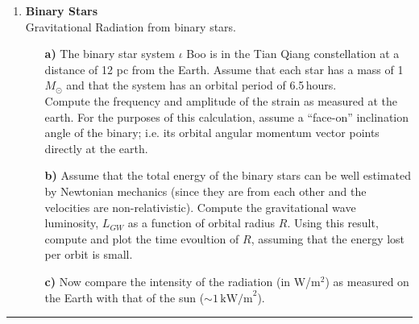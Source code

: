 \documentclass[12pt,twoside]{article}
\begin{document}
\begin{enumerate}
\clearpage
\item
{\bf Binary Stars} \\
Gravitational Radiation from binary stars.
\begin{itemize}

\item[\bf a)] The binary star system $\iota$ Boo is in the Tian Qiang
  constellation at a distance of 12 pc from the Earth. Assume that each star has a mass of 1 $M_{\odot}$ and that the system has an orbital period of 6.5\,hours. \\
  Compute the frequency and amplitude of the strain as measured
  at the earth. For the purposes of this calculation, assume a
  ``face-on'' inclination angle of the binary; i.e. its orbital
  angular momentum vector points directly at the earth.

\item[\bf b)] Assume that the total energy of the binary stars can
  be well estimated by Newtonian mechanics (since they are from each
  other and the velocities are non-relativistic). Compute the
  gravitational wave luminosity, $L_{GW}$ as a function of orbital
  radius $R$. Using this result, compute and plot the time evoultion
  of $R$, assuming that the energy lost per orbit is small.

\item[\bf c)] Now compare the intensity of the radiation (in W/m$^2$)
as measured on the Earth with that of the sun ($\sim 1\,\mbox{kW/m}^2$).

\end{itemize}



\end{enumerate}

\bigskip
{\color{awesome} \hrule}
\end{document}
